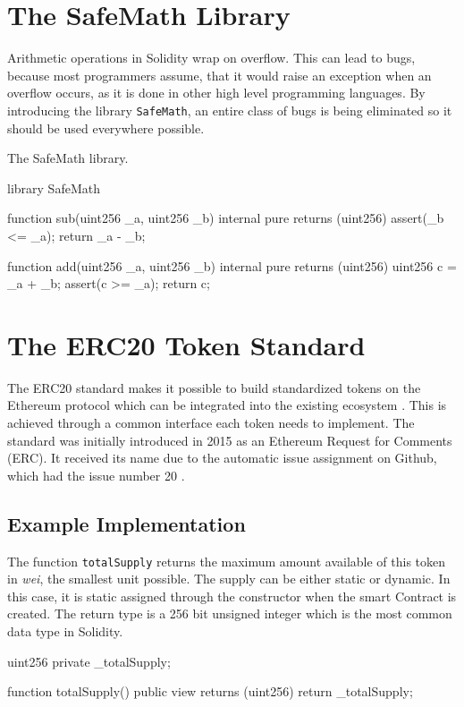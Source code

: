 \section{The SafeMath Library}
Arithmetic operations in Solidity wrap on overflow. This can lead to bugs, because most programmers assume, that it would raise an exception when an overflow occurs, as it is done in other high level programming languages. By introducing the library \texttt{SafeMath}, an entire class of bugs is being eliminated so it should be used everywhere possible.

\begin{program}
\caption{The SafeMath library.}
\label{prog:SafeMath}
\begin{GenericCode}
library SafeMath {
  function sub(uint256 _a, uint256 _b) internal pure returns (uint256) {
    assert(_b <= _a);
    return _a - _b;
  }

  function add(uint256 _a, uint256 _b) internal pure returns (uint256) {
    uint256 c = _a + _b;
    assert(c >= _a);
    return c;
  }
}
\end{GenericCode}
\end{program}

\section{The ERC20 Token Standard}
\label{sec:ERC20}
The ERC20 standard makes it possible to build standardized tokens on the Ethereum protocol which can be integrated into the existing ecosystem \cite{ERC20}. This is achieved through a common interface each token needs to implement. The standard was initially introduced in 2015 as an Ethereum Request for Comments (ERC). It received its name due to the automatic issue assignment on Github, which had the issue number 20 \cite{AntonopoulosWood2018, BadrHorrocksWu2018}.

\subsection{Example Implementation}
The function \texttt{totalSupply} returns the maximum amount available of this token in \textit{wei}, the smallest unit possible. The supply can be either static or dynamic. In this case, it is static assigned through the constructor when the smart Contract is created. The return type is a 256 bit unsigned integer which is the most common data type in Solidity.

\begin{GenericCode}
 uint256 private _totalSupply;
  
 function totalSupply() public view returns (uint256) {
   return _totalSupply;
 }	
\end{GenericCode}

